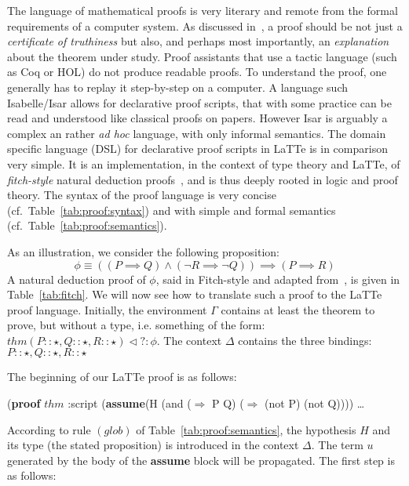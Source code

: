 \documentclass{styles/sig-alternate-05-2015}
\newcommand{\typeterm}{\star}
\newcommand{\kw}[1]{\textbf{#1}}
\begin{document}
The language of mathematical proofs is very literary and remote
from the formal requirements of a computer system. As discussed
in~\cite{Geuvers2009}, a proof should be not just a \emph{certificate
  of truthiness} but also, and perhaps most importantly, an
\emph{explanation} about the theorem under study. Proof assistants
that use a tactic language (such as Coq or HOL) do not produce
readable proofs. To understand the proof, one generally has to replay
it step-by-step on a computer. A language such Isabelle/Isar
allows for declarative proof scripts, that with some practice can be
read and understood like classical proofs on papers. However Isar is
arguably a complex an rather \emph{ad hoc} language, with only
informal semantics. The domain specific language (DSL) for declarative
proof scripts in LaTTe is in comparison very simple. It is an
implementation, in the context of type theory and LaTTe, of
\emph{fitch-style} natural deduction
proofs~\cite{natural-deduc:history}, and is thus deeply rooted in
logic and proof theory. The syntax of the proof language is very
concise (cf.~Table~\ref{tab:proof:syntax}) and with simple and formal
semantics (cf.~Table~\ref{tab:proof:semantics}).

As an illustration, we consider the following proposition:
$$\phi \equiv ((P \implies Q) \land (\lnot R \implies \lnot Q)) \implies (P \implies R)$$
A natural deduction proof of $\phi$, said in Fitch-style and adapted
from~\cite{natural-deduc:history}, is given in
Table~\ref{tab:fitch}. We will now see how to translate such a
proof to the LaTTe proof language. Initially, the environment $\Gamma$ contains at least the
theorem to prove, but without a type, i.e. something of the form:
$thm(P::\typeterm,Q::\typeterm,R::\typeterm)\triangleleft ? : \phi$. The context $\Delta$ contains the three bindings: $P::\typeterm,Q::\typeterm,R::\typeterm$

The beginning of our LaTTe proof is as follows:

\begin{program}
(\kw{proof} $thm$ :script
  (\kw{assume}(H (and ($\Longrightarrow$ P Q)
                 ($\Longrightarrow$ (not P) (not Q))))
    \ldots
\end{program}

According to rule $(glob)$ of Table~\ref{tab:proof:semantics}, the hypothesis $H$ and its type (the stated proposition) is introduced in the context $\Delta$. The term $u$ generated by the body of the \kw{assume} block will be propagated. The first step is as follows:
\end{document}
